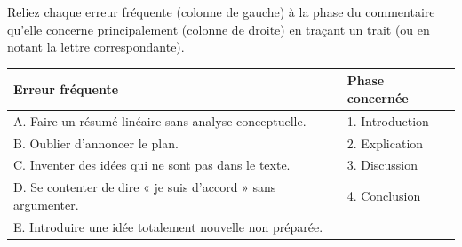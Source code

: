 \documentclass[11pt]{article}
\begin{document}
\begin{exercice}
\noindent Reliez chaque erreur fréquente (colonne de gauche) à la phase du commentaire qu'elle concerne principalement (colonne de droite) en traçant un trait (ou en notant la lettre correspondante).
\begin{tabularx}{\linewidth}{|X|X|}
\hline
\textbf{Erreur fréquente} & \textbf{Phase concernée} \\ \hline
A. Faire un résumé linéaire sans analyse conceptuelle. & 1. Introduction \\ \hline
B. Oublier d'annoncer le plan. & 2. Explication \\ \hline
C. Inventer des idées qui ne sont pas dans le texte. & 3. Discussion \\ \hline
D. Se contenter de dire « je suis d'accord » sans argumenter. & 4. Conclusion \\ \hline
E. Introduire une idée totalement nouvelle non préparée. & \\ \hline
\end{tabularx}
\end{exercice}
\end{document}
